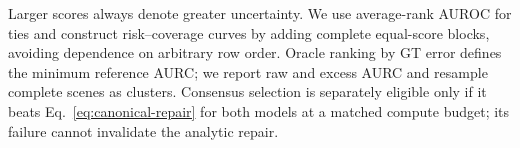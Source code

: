 Larger scores always denote greater uncertainty.  We use average-rank AUROC
for ties and construct risk--coverage curves by adding complete equal-score
blocks, avoiding dependence on arbitrary row order.  Oracle ranking by GT
error defines the minimum reference AURC; we report raw and excess AURC and
resample complete scenes as clusters.  Consensus selection is separately
eligible only if it beats Eq.~\eqref{eq:canonical-repair} for both models at a
matched compute budget; its failure cannot invalidate the analytic repair.
